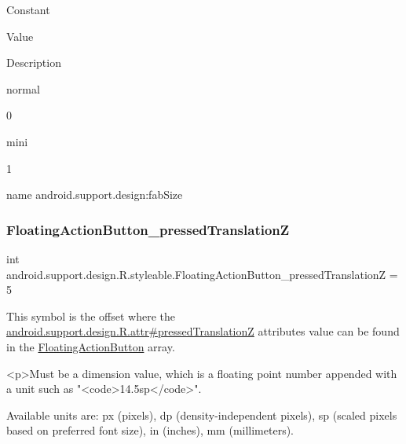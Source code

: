 Constant

Value

Description 

{\ttfamily normal}

0

{\ttfamily mini}

1

name android.\+support.\+design\+:fab\+Size \mbox{\label{classandroid_1_1support_1_1design_1_1R_1_1styleable_a74997a047886cf139621d06e7bdd2f06}} 
\subsubsection{\texorpdfstring{Floating\+Action\+Button\+\_\+pressed\+TranslationZ}{FloatingActionButton\_pressedTranslationZ}}
{\footnotesize\ttfamily int android.\+support.\+design.\+R.\+styleable.\+Floating\+Action\+Button\+\_\+pressed\+TranslationZ = 5\hspace{0.3cm}{\ttfamily [static]}}

This symbol is the offset where the \hyperlink{classandroid_1_1support_1_1design_1_1R_1_1attr_a04a96d87b401abecc5a029d980972cd7}{android.\+support.\+design.\+R.\+attr\#pressed\+TranslationZ} attribute\textquotesingle{}s value can be found in the \hyperlink{classandroid_1_1support_1_1design_1_1R_1_1styleable_ac39eabec239d50ec950ae5f013825830}{Floating\+Action\+Button} array.

\begin{DoxyVerb}      <p>Must be a dimension value, which is a floating point number appended with a unit such as "<code>14.5sp</code>".
\end{DoxyVerb}
 Available units are\+: px (pixels), dp (density-\/independent pixels), sp (scaled pixels based on preferred font size), in (inches), mm (millimeters). 

